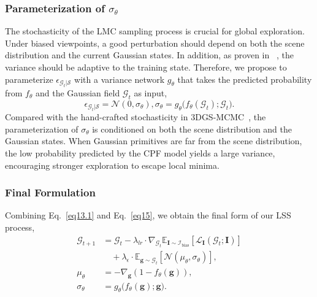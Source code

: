 \documentclass[lettersize,journal]{IEEEtran}
\begin{document}
\subsubsection{Parameterization of $\sigma_{\theta}$}

The stochasticity of the LMC sampling process is crucial for global exploration. 
Under biased viewpoints, a good perturbation should depend on both the scene distribution and the current Gaussian states. 
In addition, as proven in ~\cite{sgld2}, the variance should be adaptive to the training state. Therefore, we propose to parameterize $\epsilon_{\mathcal{G}_t \vert \mathcal{S}}$ with a variance network $g_{\theta}$ that takes the predicted probability from $f_{\theta}$ and the Gaussian field $\mathcal{G}_t$ as input,
\begin{equation}
    \epsilon_{\mathcal{G}_t \vert \mathcal{S}} = \mathcal{N} (0, \sigma_{\theta}), \sigma_{\theta} = g_{\theta}\big(f_{\theta}(\mathcal{G}_t); \mathcal{G}_t\big).
    \label{eq15}
\end{equation}
Compared with the hand-crafted stochasticity in 3DGS-MCMC~\cite{mcmc}, the parameterization of $\sigma_{\theta}$ is conditioned on both the scene distribution and the Gaussian states. When Gaussian primitives are far from the scene distribution, the low probability predicted by the CPF model yields a large variance, encouraging stronger exploration to escape local minima. 

\subsubsection{Final Formulation}

Combining Eq.~\ref{eq13.1} and Eq.~\ref{eq15}, we obtain the final form of our LSS process, 
\begin{align}
    \mathcal{G}_{t+1} &= \mathcal{G}_t - \lambda_{lr} \cdot \nabla_{\mathcal{G}_t} \mathbb{E}_{\mathbf{I} \sim \mathcal{I}_{\text{bias}}} \left[ \mathcal{L}_{\mathbf{I}} \left( \mathcal{G}_t; \mathbf{I}\right) \right] \nonumber\\
        &\quad + \lambda_{\epsilon} \cdot \mathbb{E}_{\mathbf{g} \sim \mathcal{G}_t} \left[ \mathcal{N}(\mu_{\theta}, \sigma_{\theta}) \right], \label{eq16}\\
    \mu_{\theta} &= -  \nabla_{\mathbf{g}}  \left( 1 -  f_{\theta}( \mathbf{g} ) \right), \label{eq17}\\
    \sigma_{\theta} &= g_{\theta}\big(f_{\theta}(\mathbf{g}); \mathbf{g}\big). \label{eq18}
\end{align}
\end{document}
